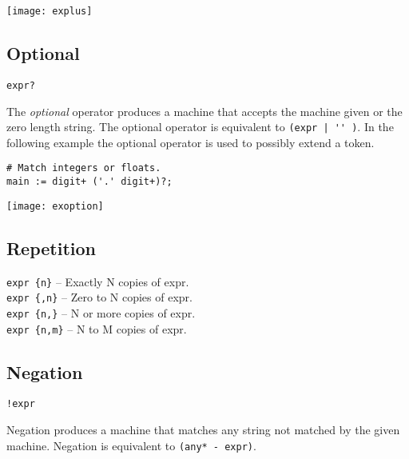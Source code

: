 \documentclass[letterpaper,11pt,oneside]{book}
\newcommand{\verbspace}{\vspace{10pt}}
\newcommand{\graphspace}{\vspace{10pt}}
\newenvironment{inline_code}{\def\baselinestretch{1}\vspace{12pt}\small}{}
\begin{document}
\graphspace
\begin{center}
\texttt{[image: explus]}
\end{center}
\graphspace

\subsection{Optional}

\verb|expr?|

The {\em optional} operator produces a machine that accepts the machine
given or the zero length string. The optional operator is equivalent to
\verb/(expr | '' )/. In the following example the optional operator is used to
possibly extend a token.

\begin{inline_code}
\begin{verbatim}
# Match integers or floats.
main := digit+ ('.' digit+)?;
\end{verbatim}
\end{inline_code}
\verbspace
% }%%
% END GENERATE

\graphspace
\begin{center}
\texttt{[image: exoption]}
\end{center}
\graphspace

\subsection{Repetition}

\noindent\hspace*{24pt}\verb|expr {n}| -- Exactly N copies of expr.\\
\noindent\hspace*{24pt}\verb|expr {,n}| -- Zero to N copies of expr.\\
\noindent\hspace*{24pt}\verb|expr {n,}| -- N or more copies of expr.\\
\noindent\hspace*{24pt}\verb|expr {n,m}| -- N to M copies of expr.
\vspace{12pt}

\subsection{Negation}

\verb|!expr|

Negation produces a machine that matches any string not matched by the given
machine. Negation is equivalent to \verb|(any* - expr)|.
\end{document}
